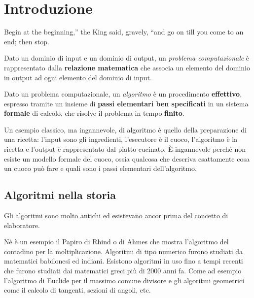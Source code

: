 
\ifsubfile
\pagestyle{plain}
\setcounter{chapter}{0}


\fi
\chapter{Introduzione}
\begin{fquote}
Begin at the beginning,'' the King said, gravely, ``and go on till you come to an end; then stop.
\end{fquote}

\begin{definition*}
Dato un dominio di input e un dominio di output, un \emph{problema computazionale} è rappresentato dalla \textbf{relazione matematica} che associa un elemento del dominio in output ad ogni elemento del dominio di input.
\end{definition*}

\begin{definition*}[algoritmo]
Dato un problema computazionale, un \emph{algoritmo} è un procedimento \textbf{effettivo}, espresso tramite un insieme di \textbf{passi elementari ben specificati} in un sistema \textbf{formale} di calcolo, che risolve il problema in tempo \textbf{finito}.
\end{definition*}

Un esempio classico, ma ingannevole, di algoritmo è quello della preparazione di una ricetta: l'input sono gli ingredienti, l'esecutore è il cuoco, l'algoritmo è la ricetta e l'output è rappresentato dal piatto cucinato.
\`E ingannevole perché non esiste un modello formale del cuoco, ossia qualcosa che descriva esattamente cosa un cuoco può fare e quali sono i passi elementari dell'algoritmo.

\section*{Algoritmi nella storia}

Gli algoritmi sono molto antichi ed esistevano ancor prima del concetto di elaboratore.

Nè è un esempio il Papiro di Rhind o di Ahmes che mostra l'algoritmo del contadino per la moltiplicazione.
Algoritmi di tipo numerico furono studiati da matematici babilonesi ed indiani.
Esistono algoritmi in uso fino a tempi recenti che furono studiati dai matematici greci più di 2000 anni fa.
Come ad esempio l'algoritmo di Euclide per il massimo comune divisore e gli algoritmi geometrici come il calcolo di tangenti, sezioni di angoli, etc.\

